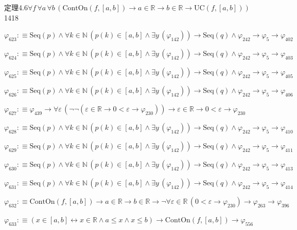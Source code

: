 \begin{fullproof}{定理4.6}{$\forall f\,\forall a\,\forall b\,(\mathrm{ContOn}(f,[a,b]) \to a \in \mathbb{R} \to b \in \mathbb{R} \to \mathrm{UC}(f,[a,b]))$}{1418}
\begin{abbrevlist}
\item $\varphi_{623} :\equiv \mathrm{Seq}(p) \land \forall k \in \mathbb{N}\,(p(k) \in [a,b] \land \exists y\,(\varphi_{142})) \to \mathrm{Seq}(q) \land \varphi_{242} \to \varphi_{5} \to \varphi_{402}$
\item $\varphi_{624} :\equiv \mathrm{Seq}(p) \land \forall k \in \mathbb{N}\,(p(k) \in [a,b] \land \exists y\,(\varphi_{142})) \to \mathrm{Seq}(q) \land \varphi_{242} \to \varphi_{5} \to \varphi_{403}$
\item $\varphi_{625} :\equiv \mathrm{Seq}(p) \land \forall k \in \mathbb{N}\,(p(k) \in [a,b] \land \exists y\,(\varphi_{142})) \to \mathrm{Seq}(q) \land \varphi_{242} \to \varphi_{5} \to \varphi_{405}$
\item $\varphi_{626} :\equiv \mathrm{Seq}(p) \land \forall k \in \mathbb{N}\,(p(k) \in [a,b] \land \exists y\,(\varphi_{142})) \to \mathrm{Seq}(q) \land \varphi_{242} \to \varphi_{5} \to \varphi_{406}$
\item $\varphi_{627} :\equiv \varphi_{439} \to \forall \varepsilon\,(\neg \neg (\varepsilon \in \mathbb{R} \to 0 < \varepsilon \to \varphi_{230})) \to \varepsilon \in \mathbb{R} \to 0 < \varepsilon \to \varphi_{230}$
\item $\varphi_{628} :\equiv \mathrm{Seq}(p) \land \forall k \in \mathbb{N}\,(p(k) \in [a,b] \land \exists y\,(\varphi_{142})) \to \mathrm{Seq}(q) \land \varphi_{242} \to \varphi_{5} \to \varphi_{410}$
\item $\varphi_{629} :\equiv \mathrm{Seq}(p) \land \forall k \in \mathbb{N}\,(p(k) \in [a,b] \land \exists y\,(\varphi_{142})) \to \mathrm{Seq}(q) \land \varphi_{242} \to \varphi_{5} \to \varphi_{411}$
\item $\varphi_{630} :\equiv \mathrm{Seq}(p) \land \forall k \in \mathbb{N}\,(p(k) \in [a,b] \land \exists y\,(\varphi_{142})) \to \mathrm{Seq}(q) \land \varphi_{242} \to \varphi_{5} \to \varphi_{413}$
\item $\varphi_{631} :\equiv \mathrm{Seq}(p) \land \forall k \in \mathbb{N}\,(p(k) \in [a,b] \land \exists y\,(\varphi_{142})) \to \mathrm{Seq}(q) \land \varphi_{242} \to \varphi_{5} \to \varphi_{414}$
\item $\varphi_{632} :\equiv \mathrm{ContOn}(f,[a,b]) \to a \in \mathbb{R} \to b \in \mathbb{R} \to \neg \forall \varepsilon \in \mathbb{R}\,(0 < \varepsilon \to \varphi_{230}) \to \varphi_{263} \to \varphi_{396}$
\item $\varphi_{633} :\equiv (x \in [a,b] \leftrightarrow x \in \mathbb{R} \land a \leq x \land x \leq b) \to \mathrm{ContOn}(f,[a,b]) \to \varphi_{556}$

\end{abbrevlist}
\end{fullproof}
